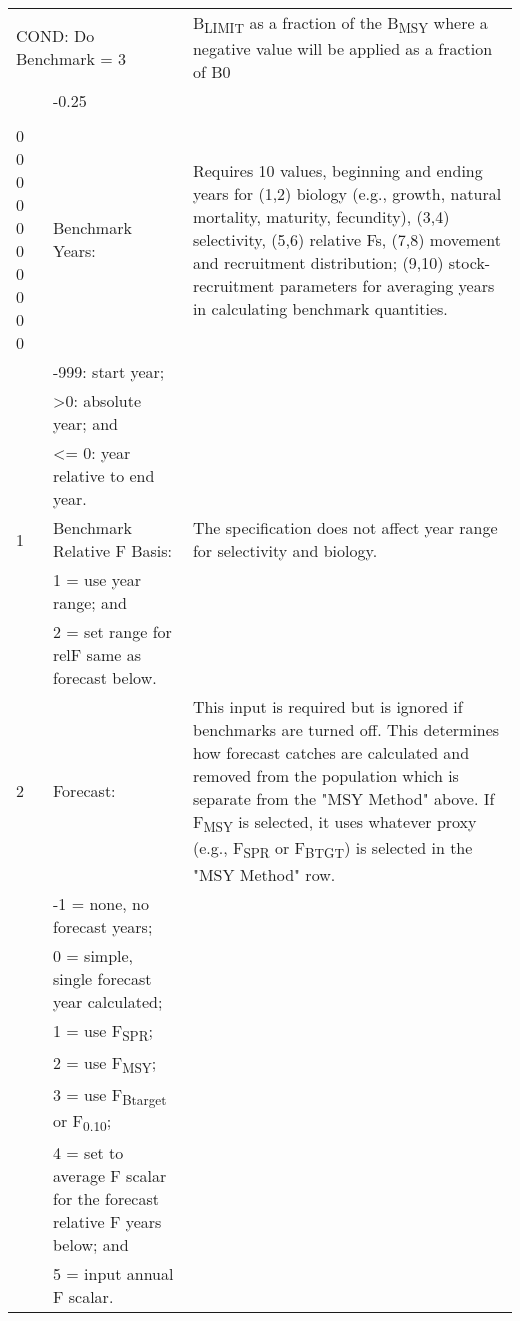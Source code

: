 \begin{landscape}
{\begin{longtable}{p{3.2cm} p{7cm} p{10.8cm}}
 \hline 
 \multicolumn{2}{l}{COND: Do Benchmark = 3} &  \multirow{1}{1cm}[-0.1cm]{\parbox{11cm}{B\textsubscript{LIMIT} as a fraction of the B\textsubscript{MSY} where a negative value will be applied as a fraction of B0}}\Tstrut\\
     & -0.25 &  \\
     &       & \Bstrut\\
  
  
 \hline
 0 0 0 0 0 0 0 0 0 0 & Benchmark Years: & \multirow{1}{1cm}[-0.25cm]{\parbox{11cm }{ Requires 10 values, beginning and ending years for (1,2) biology (e.g., growth, natural mortality, maturity, fecundity), (3,4) selectivity, (5,6) relative Fs, (7,8) movement and recruitment distribution; (9,10) stock-recruitment parameters for averaging years in calculating benchmark quantities.}} \Tstrut\\
  & -999: start year; & \\
  & >0:   absolute year; and & \\
  & <= 0: year relative to end year. & \\


  1 & Benchmark Relative F Basis: &  \multirow{1}{1cm}[-0.25cm]{\parbox{11cm }{ The specification does not affect year range for selectivity and biology.}} \Tstrut\\
    & 1 = use year range; and & \\
    & 2 = set range for relF same as forecast below. & \\
    
  \hline
  2 & Forecast: & \multirow{1}{1cm}[-0.25cm]{\parbox{11cm }{ This input is required but is ignored if benchmarks are turned off.  This determines how forecast catches are calculated and removed from the population which is separate from the "MSY Method" above. If F\textsubscript{MSY} is selected, it uses whatever proxy (e.g., F\textsubscript{SPR} or F\textsubscript{BTGT}) is selected in the "MSY Method" row.}} \Tstrut\\
    & -1 = none, no forecast years; & \\
    & 0 = simple, single forecast year calculated; & \\
    & 1 = use F\textsubscript{SPR}; & \\
    & 2 = use F\textsubscript{MSY}; & \\
    & 3 = use F\textsubscript{Btarget} or F\textsubscript{0.10}; & \\
    & 4 = set to average F scalar for the forecast relative F years below; and & \\
    & 5 = input annual F scalar. & \Bstrut\\
    

\end{longtable}}
\end{landscape}
